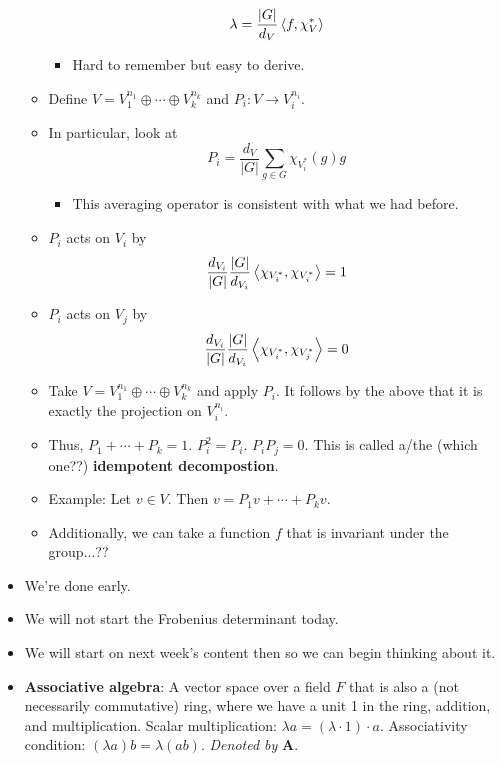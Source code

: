 \documentclass[../notes.tex]{subfiles}
\begin{document}
\begin{itemize}
\begin{itemize}
        \begin{equation*}
            \lambda = \frac{|G|}{d_V}\left\langle{f,\chi_V^*}\right\rangle
        \end{equation*}
        \begin{itemize}
            \item Hard to remember but easy to derive.
        \end{itemize}
        \item Define $V=V_1^{n_1}\oplus\cdots\oplus V_k^{n_k}$ and $P_i:V\to V_i^{n_i}$.
        \item In particular, look at
        \begin{equation*}
            P_i = \frac{d_V}{|G|}\sum_{g\in G}\chi_{V_i^*}(g)g
        \end{equation*}
        \begin{itemize}
            \item This averaging operator is consistent with what we had before.
        \end{itemize}
        \item $P_i$ acts on $V_i$ by
        \begin{equation*}
            \frac{d_{V_i}}{|G|}\frac{|G|}{d_{V_i}}\left\langle{\chi_{V_i^*},\chi_{V_i^*}}\right\rangle = 1
        \end{equation*}
        \item $P_i$ acts on $V_j$ by
        \begin{equation*}
            \frac{d_{V_i}}{|G|}\frac{|G|}{d_{V_i}}\left\langle{\chi_{V_i^*},\chi_{V_j^*}}\right\rangle = 0
        \end{equation*}
        \item Take $V=V_1^{n_1}\oplus\cdots\oplus V_k^{n_k}$ and apply $P_i$. It follows by the above that it is exactly the projection on $V_i^{n_i}$.
        \item Thus, $P_1+\cdots+P_k=1$. $P_i^2=P_i$. $P_iP_j=0$. This is called a/the (which one??) \textbf{idempotent decompostion}.
        \item Example: Let $v\in V$. Then $v=P_1v+\cdots+P_kv$.
        \item Additionally, we can take a function $f$ that is invariant under the group...??
    \end{itemize}
    \item We're done early.
    \item We will not start the Frobenius determinant today.
    \item We will start on next week's content then so we can begin thinking about it.
    \item \textbf{Associative algebra}: A vector space over a field $F$ that is also a (not necessarily commutative) ring, where we have a unit 1 in the ring, addition, and multiplication. Scalar multiplication: $\lambda a=(\lambda\cdot 1)\cdot a$. Associativity condition: $(\lambda a)b=\lambda(ab)$. \emph{Denoted by} $\bm{A}$.

\end{itemize}
\end{document}

